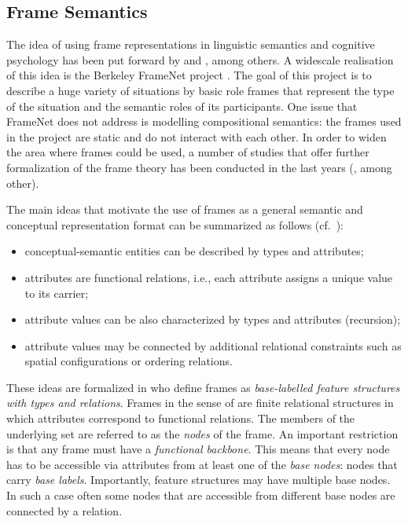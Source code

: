 \subsection{Frame Semantics}
The idea of using frame representations in linguistic semantics and cognitive
psychology has been put forward by \citet{Fillmore:82} and
\citet{Barsalou:92}, among others. A widescale realisation of this idea is the Berkeley FrameNet project \citep{Fillmore:03}. The goal of this project is to describe a huge variety of situations by basic role frames that represent the type of the situation and the semantic roles of its participants. One issue that FrameNet does not address is modelling compositional semantics: the frames used in the project are static and do not interact with each other. In order to widen the area where frames could be used, a number of studies that offer further formalization of the frame theory has been conducted in the last years (\citealt{Petersen:07, PetersenOsswald:10, KallmeyerOsswald:12, KallmeyerOsswald:13, KallmeyerOsswaldPogodalla:15, Loebner:2014}, among other).

The main ideas that motivate the use of frames as a general semantic and conceptual representation format can be summarized as follows (cf.\ \citealt{Loebner:2014}):

\begin{itemize}
\item conceptual-semantic entities can be described by types and
attributes;
\item attributes are functional relations, i.e., each attribute assigns a unique
value to its carrier;
\item attribute values can be also characterized by types and attributes (recursion);
\item attribute values may be connected by additional relational constraints \citep{Barsalou:92} such as spatial  configurations or ordering relations.
\end{itemize}

These ideas are formalized in \citet{KallmeyerOsswald:13} who define frames
as \emph{base-labelled feature structures with types and relations}.
Frames in the sense of \citet{KallmeyerOsswald:13} are finite relational structures in which attributes correspond to functional relations. The members of the underlying set are referred to as the \emph{nodes} of the frame. An important restriction is that any frame must have a \emph{functional
backbone}. This means that every node has to be accessible via attributes
from at least one of the \emph{base nodes}: nodes that carry \emph{base labels}. Importantly, feature structures may have multiple base nodes. In such a case often some nodes that are accessible from different base nodes are connected by a relation.

